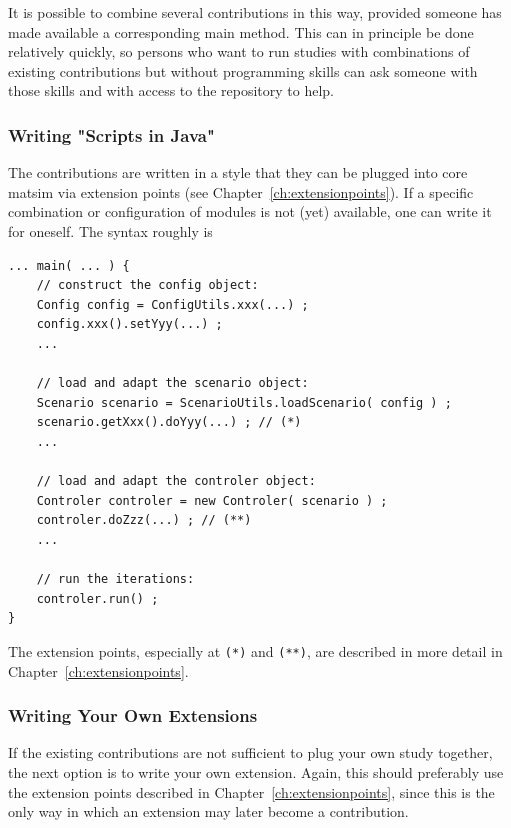 It is possible to combine several \glspl{contribution} in this way, provided someone has made available a corresponding main method.  This can in principle be done relatively quickly, so persons who want to run studies with combinations of existing \glspl{contribution} but without programming skills can ask someone with those skills and with access to the repository to help.

\subsubsection{Writing "Scripts in Java"}
\label{sec:writing-scripts-java}
The \glspl{contribution} are written in a style that they can be plugged into core \gls{matsim} via extension points (see Chapter~\ref{ch:extensionpoints}). If a specific combination or configuration of modules is not (yet) available, one can write it for oneself. The syntax roughly is
\begin{lstlisting}
... main( ... ) {
    // construct the config object:
    Config config = ConfigUtils.xxx(...) ;
    config.xxx().setYyy(...) ;
    ...

    // load and adapt the scenario object:
    Scenario scenario = ScenarioUtils.loadScenario( config ) ;
    scenario.getXxx().doYyy(...) ; // (*)
    ...

    // load and adapt the controler object:
    Controler controler = new Controler( scenario ) ;
    controler.doZzz(...) ; // (**)
    ...

    // run the iterations:
    controler.run() ;
}
\end{lstlisting}
The extension points, especially at \lstinline{(*)} and \lstinline{(**)}, are described in more detail in Chapter~\ref{ch:extensionpoints}.

\subsubsection{Writing Your Own Extensions}
\label{sec:writing-your-own-extensions}
If the existing \glspl{contribution} are not sufficient to plug your own study together, the next option is to write your own \gls{extension}.  Again, this should preferably use the extension points described in Chapter~\ref{ch:extensionpoints}, since this is the only way in which an \gls{extension} may later become a \gls{contribution}.  

